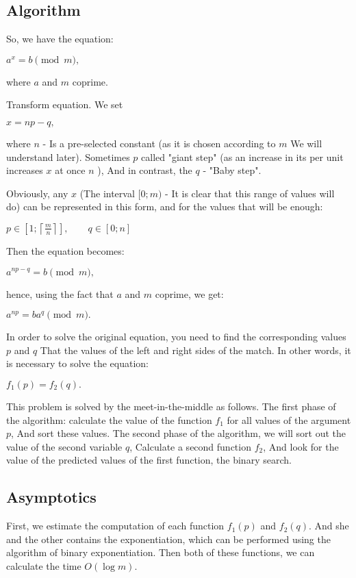 \subsection{ Algorithm }

So, we have the equation:

$a ^ x = b \pmod m,$

where $a$ and $m$ coprime.

Transform equation. We set

$x = np - q,$

where $n$ - Is a pre-selected constant (as it is chosen according to $m$ We will understand later). Sometimes $p$ called "giant step" (as an increase in its per unit increases $x$ at once $n$ ), And in contrast, the $q$ - "Baby step".

Obviously, any $x$ (The interval $[0; m)$ - It is clear that this range of values ​​will do) can be represented in this form, and for the values ​​that will be enough:

$p\in\left[1;\left\lceil \frac{m}{n}\right\rceil \right],\qquad q\in[0;n]$

Then the equation becomes:

$a ^ {np-q} = b \pmod m,$

hence, using the fact that $a$ and $m$ coprime, we get:

$a ^ {np} = b a ^ q \pmod m.$

In order to solve the original equation, you need to find the corresponding values $p$ and $q$ That the values ​​of the left and right sides of the match. In other words, it is necessary to solve the equation:

$f_1 (p) = f_2 (q).$

This problem is solved by the meet-in-the-middle as follows. The first phase of the algorithm: calculate the value of the function $f_1$ for all values ​​of the argument $p$, And sort these values. The second phase of the algorithm, we will sort out the value of the second variable $q$, Calculate a second function $f_2$, And look for the value of the predicted values ​​of the first function, the binary search.

\subsection{ Asymptotics }

First, we estimate the computation of each function $f_1 (p)$ and $f_2 (q)$. And she and the other contains the exponentiation, which can be performed using the algorithm of binary exponentiation. Then both of these functions, we can calculate the time $O (\log m)$.


